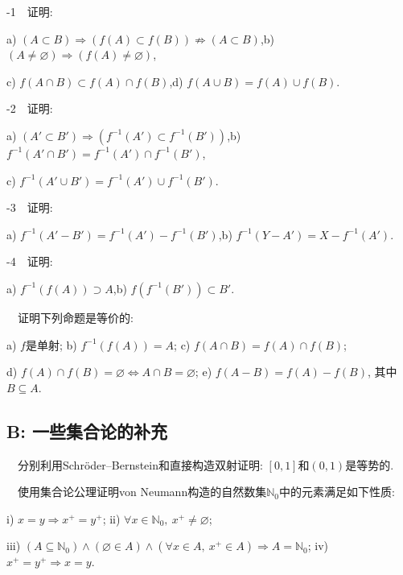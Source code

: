 -1~~证明: 
\begin{center}
	a) $(A \subset B) \Rightarrow (f(A) \subset f(B)) \nRightarrow (A \subset B)$,\qquad b) $(A \neq \varnothing) \Rightarrow (f(A) \neq \varnothing)$,
	
	c) $f(A \cap B) \subset f(A) \cap f(B)$,\qquad d) $f(A \cup B) = f(A) \cup f(B)$.
\end{center}

-2~~证明: 
\begin{center}
	a) $(A' \subset B') \Rightarrow (f^{-1}(A') \subset f^{-1}(B'))$,\qquad b) $f^{-1}(A' \cap B') = f^{-1}(A') \cap f^{-1}(B')$,
	
	c) $f^{-1}(A' \cup B') = f^{-1}(A') \cup f^{-1}(B')$.
\end{center}
	
-3~~证明: 
\begin{center}
	a) $f^{-1}(A'-B') = f^{-1}(A') - f^{-1}(B')$,\qquad b) $f^{-1}(Y-A') = X-f^{-1}(A')$.
\end{center} 

-4~~证明: 
\begin{center}
	a) $f^{-1}(f(A)) \supset A$,\qquad b) $f(f^{-1}(B')) \subset B'$.
\end{center} 
\vspace{1em}

~~证明下列命题是等价的: 

\begin{center}
	a) $f$是单射; \qquad b) $f^{-1}(f(A))=A$; \qquad c) $f(A \cap B) = f(A) \cap f(B)$;
	
	d) $f(A) \cap f(B) = \varnothing \Leftrightarrow A \cap B = \varnothing$; \qquad e) $f(A-B) = f(A) - f(B)$, 其中$B \subseteq A$. 
\end{center}
\vspace{1em}

\subsection*{B: 一些集合论的补充}

~~分别利用Schröder–Bernstein和直接构造双射证明: $[0,1]$和$(0,1)$是等势的. 
\vspace{1em}


~~使用集合论公理证明von Neumann构造的自然数集$\mathbb{N}_0$中的元素满足如下性质: 
	\begin{center}
		i) $x=y \Rightarrow x^+ = y^+$; \qquad ii) $\forall x \in \mathbb{N}_0,~x^+ \neq \varnothing$;
	
		iii) $(A \subseteq \mathbb{N}_0) \wedge (\varnothing \in A) \wedge (\forall x \in A,~x^+ \in A) \Rightarrow A=\mathbb{N}_0$; \qquad iv) $x^+=y^+ \Rightarrow x=y$.
	\end{center}

